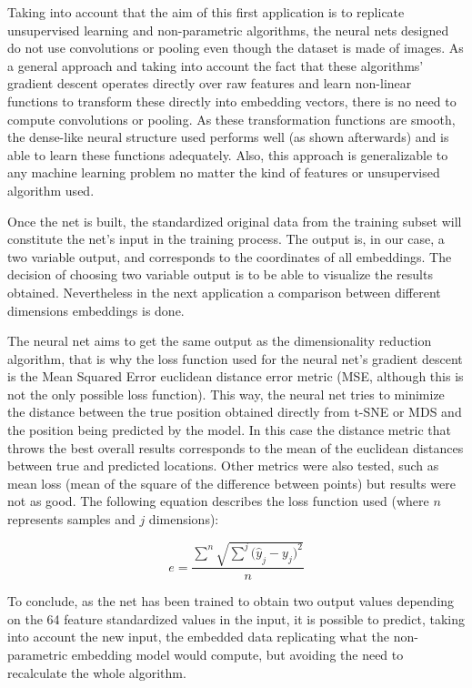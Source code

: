 \documentclass[a4paper,11pt,spanish]{report}
\begin{document}
Taking into account that the aim of this first application is to replicate unsupervised learning and non-parametric algorithms, the neural nets designed do not use convolutions or pooling even though the dataset is made of images. As a general approach and taking into account the fact that these algorithms' gradient descent operates directly over raw features and learn non-linear functions to transform these directly into embedding vectors, there is no need to compute convolutions or pooling. As these transformation functions are smooth, the dense-like neural structure used performs well (as shown afterwards) and is able to learn these functions adequately. Also, this approach is generalizable to any machine learning problem no matter the kind of features or unsupervised algorithm used.

Once the net is built, the standardized original data from the training subset will constitute the net's input in the training process. The output is, in our case, a two variable output, and corresponds to the coordinates of all embeddings. The decision of choosing two variable output is to be able to visualize the results obtained. Nevertheless in the next application a comparison between different dimensions embeddings is done.

The neural net aims to get the same output as the dimensionality reduction algorithm, that is why the loss function used for the neural net's gradient descent is the Mean Squared Error euclidean distance error metric (MSE, although this is not the only possible loss function). This way, the neural net tries to minimize the distance between the true position obtained directly from t-SNE or MDS and the position being predicted by the model. In this case the distance metric that throws the best overall results corresponds to the mean of the euclidean distances between true and predicted locations. Other metrics were also tested, such as mean loss (mean of the square of the difference between points) but results were not as good. The following equation describes the loss function used (where $n$ represents samples and $j$ dimensions):

$$ e = \frac{\sum^{n}{\sqrt{\sum^j{{(\hat{y}}}_{j} - y_{j})^{2}}}}{n} $$

To conclude, as the net has been trained to obtain two output values depending on the 64 feature standardized values in the input, it is possible to predict, taking into account the new input, the embedded data replicating what the non-parametric embedding model would compute, but avoiding the need to recalculate the whole algorithm.
\end{document}
